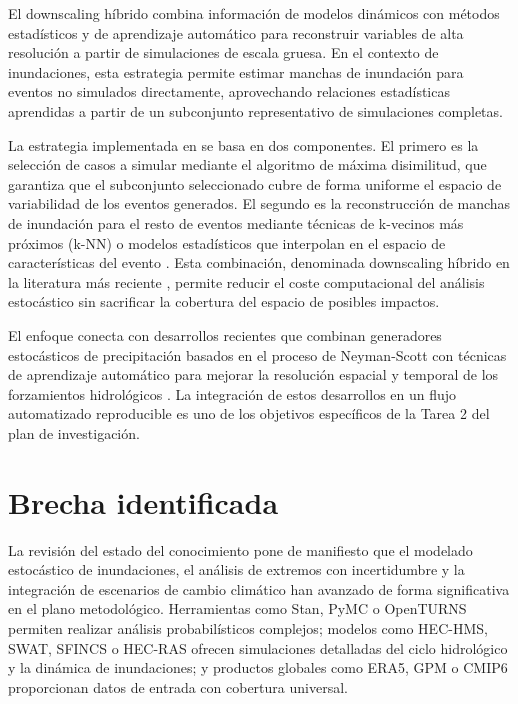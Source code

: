 El downscaling híbrido combina información de modelos dinámicos con métodos estadísticos y de aprendizaje automático para reconstruir variables de alta resolución a partir de simulaciones de escala gruesa. En el contexto de inundaciones, esta estrategia permite estimar manchas de inundación para eventos no simulados directamente, aprovechando relaciones estadísticas aprendidas a partir de un subconjunto representativo de simulaciones completas.

La estrategia implementada en \hydra se basa en dos componentes. El primero es la selección de casos a simular mediante el algoritmo de máxima disimilitud, que garantiza que el subconjunto seleccionado cubre de forma uniforme el espacio de variabilidad de los eventos generados. El segundo es la reconstrucción de manchas de inundación para el resto de eventos mediante técnicas de k-vecinos más próximos (k-NN) o modelos estadísticos que interpolan en el espacio de características del evento \parencite{ihcantabria2020foresee,ihcantabria2021m30,navas2024calle30}. Esta combinación, denominada downscaling híbrido en la literatura más reciente \parencite{deljesus2024downscaling}, permite reducir el coste computacional del análisis estocástico sin sacrificar la cobertura del espacio de posibles impactos.

El enfoque conecta con desarrollos recientes que combinan generadores estocásticos de precipitación basados en el proceso de Neyman-Scott con técnicas de aprendizaje automático para mejorar la resolución espacial y temporal de los forzamientos hidrológicos \parencite{deljesus2024downscaling}. La integración de estos desarrollos en un flujo automatizado reproducible es uno de los objetivos específicos de la Tarea 2 del plan de investigación.

\section{Brecha identificada}
\label{sec:brecha}

La revisión del estado del conocimiento pone de manifiesto que el modelado estocástico de inundaciones, el análisis de extremos con incertidumbre y la integración de escenarios de cambio climático han avanzado de forma significativa en el plano metodológico. Herramientas como Stan, PyMC o OpenTURNS permiten realizar análisis probabilísticos complejos; modelos como HEC-HMS, SWAT, SFINCS o HEC-RAS ofrecen simulaciones detalladas del ciclo hidrológico y la dinámica de inundaciones; y productos globales como ERA5, GPM o CMIP6 proporcionan datos de entrada con cobertura universal.

